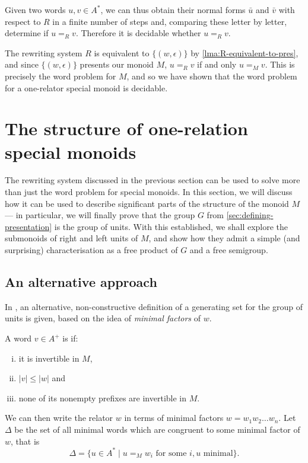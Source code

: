 \documentclass[noindex,noinsetproof,emphthm,12pt]{lmaths}
\begin{document}
Given two words $u, v \in A^*$, we can thus obtain their normal forms $\bar u$ and $\bar v$ with respect to $R$ in a finite number of steps and, comparing these letter by letter, determine if $u =_R v$. Therefore it is decidable whether $u =_R v$.

The rewriting system $R$ is equivalent to $\{(w, \epsilon)\}$ by \cref{lma:R-equivalent-to-pres}, and since $\{(w, \epsilon)\}$ presents our monoid $M$, $u =_R v$ if and only $u =_M v$. This is precisely the word problem for $M$, and so we have shown that the word problem for a one-relator special monoid is decidable.


\section{The structure of one-relation special monoids} \label{sec:structure}

The rewriting system discussed in the previous section can be used to solve more than just the word problem for special monoids. In this section, we will discuss how it can be used to describe significant parts of the structure of the monoid $M$ --- in particular, we will finally prove that the group $G$ from \cref{sec:defining-presentation} is the group of units. With this established, we shall explore the submonoids of right and left units of $M$, and show how they admit a simple (and surprising) characterisation as a free product of $G$ and a free semigroup.

\subsection{An alternative approach}

In \cite{Zhang1992}, an alternative, non-constructive definition of a generating set for the group of units is given, based on the idea of \emph{minimal factors} of $w$.

\begin{defn}
	A word $v \in A^+$ is  if:
	\begin{enumerate}[(i)]
		\item it is invertible in $M$,
		\item $|v| \le |w|$ and
		\item none of its nonempty prefixes are invertible in $M$.
	\end{enumerate}
\end{defn}

We can then write the relator $w$ in terms of minimal factors $w = w_1w_2\ldots w_n$. Let $\Delta$ be the set of all minimal words which are congruent to some minimal factor of $w$, that is
	\[ \Delta = \{ u \in A^* \mid u =_M w_i \text{ for some } i, u\text{ minimal} \}. \]
\end{document}
